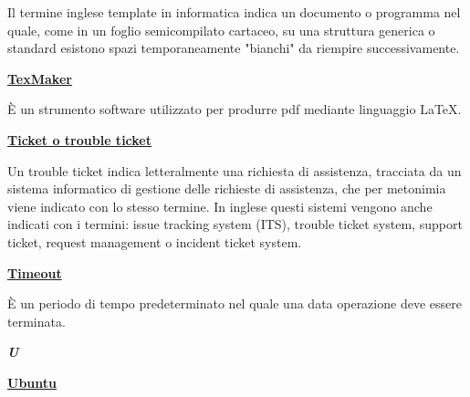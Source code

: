 \medskip
\begin{addmargin}[5em]{1em}	
Il termine inglese template in informatica indica un documento o programma nel quale, come in un foglio semicompilato cartaceo, su una struttura generica o standard esistono spazi temporaneamente "bianchi" da riempire successivamente.
\end{addmargin}

\bigskip
\begin{addmargin}[0em]{0em}		
	\textbf{\underline{TexMaker}}
\end{addmargin} 
	
\medskip
\begin{addmargin}[5em]{1em}	
È un strumento software utilizzato per produrre pdf mediante linguaggio \LaTeX{}.
\end{addmargin}

\bigskip
\begin{addmargin}[0em]{0em}		
	\textbf{\underline{Ticket o trouble ticket}}
\end{addmargin}
	
\medskip
\begin{addmargin}[5em]{1em}	 
Un trouble ticket indica letteralmente una richiesta di assistenza, tracciata da un sistema informatico di gestione delle richieste di assistenza, che per metonimia viene indicato con lo stesso termine.
In inglese questi sistemi vengono anche indicati con i termini: issue tracking system (ITS), trouble ticket system, support ticket, request management o incident ticket system.
\end{addmargin}

\bigskip
\begin{addmargin}[0em]{0em}	
	\textbf{\underline{Timeout}}
\end{addmargin}

\medskip
\begin{addmargin}[5em]{1em}
È un periodo di tempo predeterminato nel quale una data operazione deve essere terminata.
\end{addmargin}

\newpage

\cleardoublepage
{}
{}
\noindent\hrulefill\hspace{4mm}\textbf{\textsl{\Huge{U}}}\hspace{4mm}\hrulefill
\vspace*{2\bigskipamount}	

\begin{addmargin}[0em]{0em}
	\textbf{\underline{Ubuntu}}
\end{addmargin}

